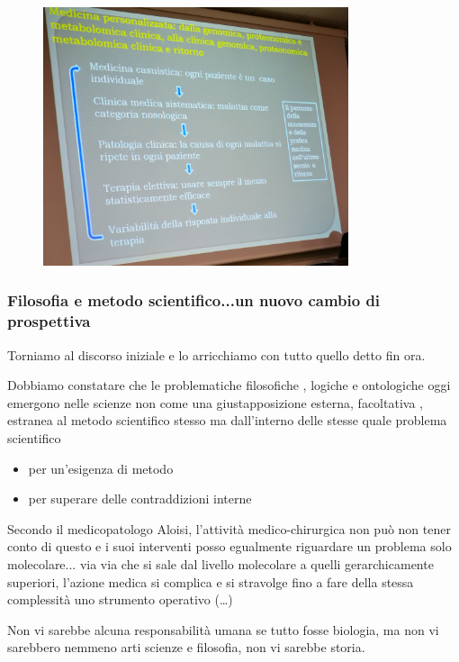   \begin{figure}[!ht]
\centering
	\includegraphics[width=0.8\textwidth]{33/image4.jpeg}
	\end{figure}

  \subsubsection{Filosofia e metodo scientifico...un nuovo cambio di prospettiva}

  Torniamo al discorso iniziale e lo arricchiamo con tutto quello detto
  fin ora.

  Dobbiamo constatare che le problematiche filosofiche , logiche e
  ontologiche oggi emergono nelle scienze non come una giustapposizione
  esterna, facoltativa , estranea al metodo scientifico stesso ma
  dall'interno delle stesse quale problema scientifico
\begin{itemize}
\item per un'esigenza di metodo
\item per superare delle contraddizioni interne
\end{itemize}

  Secondo il medicopatologo Aloisi, l'attività medico-chirurgica non può
  non tener conto di questo e i suoi interventi posso egualmente
  riguardare un problema solo molecolare... via via che si sale dal
  livello molecolare a quelli gerarchicamente superiori, l'azione medica
  si complica e si stravolge fino a fare della stessa complessità uno
  strumento operativo (\ldots{})

  Non vi sarebbe alcuna responsabilità umana se tutto fosse biologia, ma
  non vi sarebbero nemmeno arti scienze e filosofia, non vi sarebbe
  storia.

